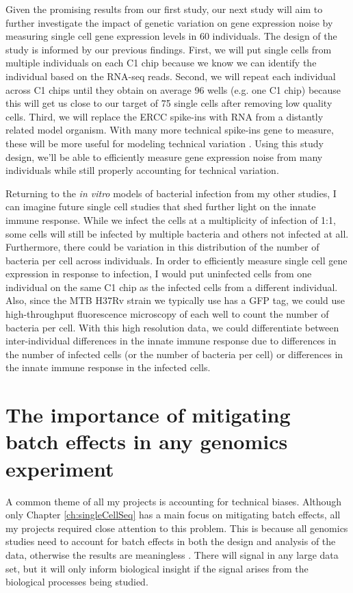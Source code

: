 Given the promising results from our first study, our next study will
aim to further investigate the impact of genetic variation on gene
expression noise by measuring single cell gene expression levels in 60
individuals. The design of the study is informed by our previous
findings. First, we will put single cells from multiple individuals on
each C1 chip because we know we can identify the individual based on
the RNA-seq reads. Second, we will repeat each individual across C1
chips until they obtain on average 96 wells (e.g. one C1 chip) because
this will get us close to our target of 75 single cells after removing
low quality cells. Third, we will replace the ERCC spike-ins with RNA
from a distantly related model organism. With many more technical
spike-ins gene to measure, these will be more useful for modeling
technical variation \citep{Risso2014}. Using this study design, we’ll
be able to efficiently measure gene expression noise from many
individuals while still properly accounting for technical variation.

Returning to the \emph{in vitro} models of bacterial infection from my
other studies, I can imagine future single cell studies that shed
further light on the innate immune response. While we infect the cells
at a multiplicity of infection of 1:1, some cells will still be
infected by multiple bacteria and others not infected at
all. Furthermore, there could be variation in this distribution of the
number of bacteria per cell across individuals. In order to
efficiently measure single cell gene expression in response to
infection, I would put uninfected cells from one individual on the
same C1 chip as the infected cells from a different individual. Also,
since the MTB H37Rv strain we typically use has a GFP tag, we could
use high-throughput fluorescence microscopy of each well to count the
number of bacteria per cell. With this high resolution data, we could
differentiate between inter-individual differences in the innate
immune response due to differences in the number of infected cells (or
the number of bacteria per cell) or differences in the innate immune
response in the infected cells.

\section{The importance of mitigating batch effects in any genomics experiment}

A common theme of all my projects is accounting for technical
biases. Although only Chapter \ref{ch:singleCellSeq} has a main focus
on mitigating batch effects, all my projects required close attention
to this problem. This is because all genomics studies need to account
for batch effects in both the design and analysis of the data,
otherwise the results are meaningless \citep{Auer2010, Leek2010, Gilad2015}. There will signal in any large
data set, but it will only inform biological insight if the signal
arises from the biological processes being studied.

